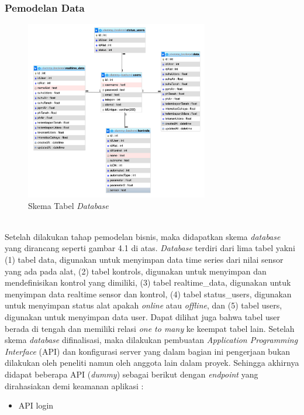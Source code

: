 \begin{flushleft}
\begin{justify}
        \subsubsection{Pemodelan Data}
        \begin{figure}[ht]
            \centering
            \includegraphics[width=8cm]{images/database.png}
            \caption{Skema Tabel \textit{Database}}
        \end{figure}
        \noindent \\Setelah dilakukan tahap pemodelan bisnis, maka didapatkan skema \emph{database} yang dirancang seperti gambar 4.1 di atas. \emph{Database} terdiri dari lima tabel yakni (1) tabel data, digunakan untuk menyimpan data time series dari nilai sensor yang ada pada alat, 
        (2) tabel kontrols, digunakan untuk menyimpan dan mendefinisikan kontrol yang dimiliki, 
        (3) tabel realtime\_data, digunakan untuk menyimpan data realtime sensor dan kontrol,
        (4) tabel status\_users, digunakan untuk menyimpan status alat apakah \emph{online} atau \emph{offline},
        dan (5) tabel users, digunakan untuk menyimpan data user. Dapat dilihat juga bahwa tabel user berada di tengah dan memiliki relasi \emph{one to many} ke keempat tabel lain. Setelah skema \emph{database} difinalisasi, 
        maka dilakukan pembuatan \emph{Application Programming Interface} (API) dan konfigurasi server yang dalam bagian ini 
        pengerjaan bukan dilakukan oleh peneliti namun oleh anggota lain dalam proyek. 
        Sehingga akhirnya didapat beberapa API (\emph{dummy}) sebagai berikut dengan \emph{endpoint} yang dirahasiakan demi keamanan aplikasi :
            \begin{itemize}
                \item API login\\

\end{itemize}
\end{justify}
\end{flushleft}
